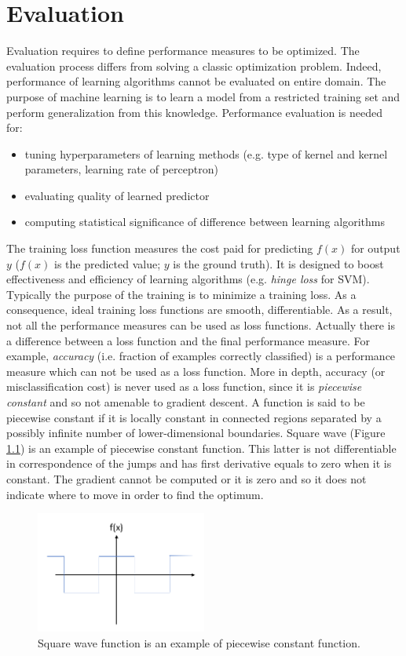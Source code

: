 \chapter{Evaluation}
\label{cha:evaluation}
Evaluation requires to define performance measures to be optimized. The evaluation process differs from solving a classic optimization problem. Indeed, performance of learning algorithms cannot be evaluated on entire domain. The purpose of machine learning is to learn a model from a restricted training set and perform generalization from this knowledge. Performance evaluation is needed for:
\begin{itemize}
    \item tuning hyperparameters of learning methods (e.g. type of kernel and kernel parameters, learning rate of perceptron)
    \item evaluating quality of learned predictor
    \item computing statistical significance of difference between learning algorithms
\end{itemize}

The training loss function measures the cost paid for predicting $f(x)$ for output $y$ ($f(x)$ is the predicted value; $y$ is the ground truth). It is designed to boost effectiveness and efficiency of learning algorithms (e.g. \textit{hinge loss} for SVM). Typically the purpose of the training is to minimize a training loss. As a consequence, ideal training loss functions are smooth, differentiable. As a result, not all the performance measures can be used as loss functions. Actually there is a difference between a loss function and the final performance measure. For example, \textit{accuracy} (i.e. fraction of examples correctly classified) is a performance measure which can not be used as a loss function. More in depth, accuracy (or misclassification cost) is never used as a loss function, since it is \textit{piecewise constant} and so not amenable to gradient descent. A function is said to be piecewise constant if it is locally constant in connected regions separated by a possibly infinite number of lower-dimensional boundaries. Square wave (Figure \ref{fig:square_wave}) is an example of piecewise constant function. This latter is not differentiable in correspondence of the jumps and has first derivative equals to zero when it is constant. The gradient cannot be computed or it is zero and so it does not indicate where to move in order to find the optimum. 

\begin{figure}
    \centering
    \includegraphics[width=0.5\textwidth]{images/square-wave-function.png}
    \caption{Square wave function is an example of piecewise constant function.}
    \label{fig:square_wave}
\end{figure}

